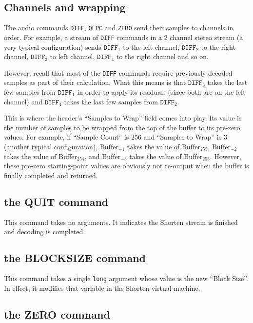 \subsection{Channels and wrapping}
The audio commands \texttt{DIFF}, \texttt{QLPC} and \texttt{ZERO} send
their samples to channels in order.
For example, a stream of \texttt{DIFF} commands in a 2 channel stereo
stream (a very typical configuration) sends $\texttt{DIFF}_1$ to
the left channel, $\texttt{DIFF}_2$ to the right channel,
$\texttt{DIFF}_3$ to left channel, $\texttt{DIFF}_4$ to the right channel
and so on.

However, recall that most of the \texttt{DIFF} commands require
previously decoded samples as part of their calculation.
What this means is that $\texttt{DIFF}_3$ takes the last
few samples from $\texttt{DIFF}_1$ in order to apply its residuals
(since both are on the left channel) and $\texttt{DIFF}_4$
takes the last few samples from $\texttt{DIFF}_2$.

This is where the header's ``Samples to Wrap'' field comes into play.
Its value is the number of samples to be wrapped from the top of the buffer
to its pre-zero values.
For example, if ``Sample Count'' is 256 and ``Samples to Wrap'' is 3
(another typical configuration),
$\text{Buffer}_{-1}$ takes the value of $\text{Buffer}_{255}$,
$\text{Buffer}_{-2}$ takes the value of $\text{Buffer}_{254}$, and
$\text{Buffer}_{-3}$ takes the value of $\text{Buffer}_{253}$.
However, these pre-zero starting-point values are obviously not
re-output when the buffer is finally completed and returned.

\subsection{the QUIT command}

This command takes no arguments.
It indicates the Shorten stream is finished and decoding is completed.

\subsection{the BLOCKSIZE command}

This command takes a single \texttt{long} argument
whose value is the new ``Block Size''.
In effect, it modifies that variable in the Shorten virtual machine.

\subsection{the ZERO command}

